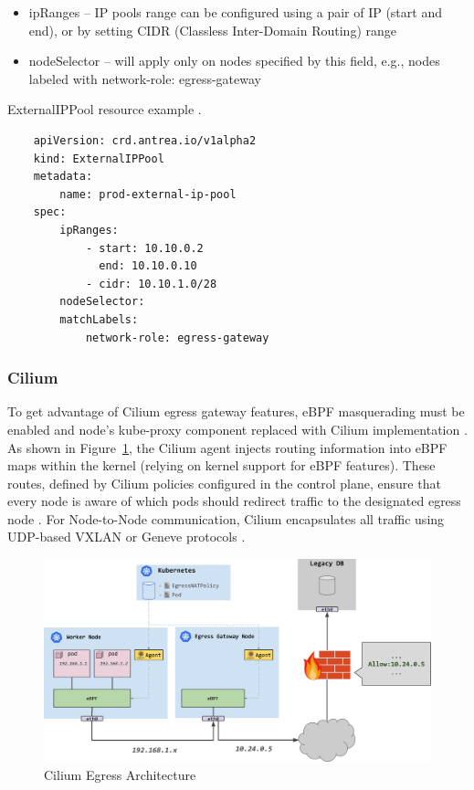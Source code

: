 \begin{itemize}
    \item ipRanges -- IP pools range can be configured using a pair of IP (start and end), or by setting CIDR (Classless Inter-Domain Routing) range
    \item nodeSelector -- will apply only on nodes specified by this field, e.g., nodes labeled with network-role: egress-gateway
\end{itemize}

\begin{listing}[htb]
    \centering
    \caption{ExternalIPPool resource example \cite{AntreaEgressArch}.}
    \begin{verbatim}
    apiVersion: crd.antrea.io/v1alpha2
    kind: ExternalIPPool
    metadata:
        name: prod-external-ip-pool
    spec:
        ipRanges:
            - start: 10.10.0.2
              end: 10.10.0.10
            - cidr: 10.10.1.0/28
        nodeSelector:
        matchLabels:
            network-role: egress-gateway
    \end{verbatim}
    \label{lst:yamlAntreaExternalIPPool}
\end{listing}
  


\subsubsection{Cilium}
\label{subsection:ciliumEgress}

To get advantage of Cilium egress gateway features, eBPF masquerading must be enabled and node's kube-proxy component replaced with Cilium implementation \cite{CiliumEgressGateway}. As shown in Figure~\ref{fig:ciliumEgressArch}, the Cilium agent injects routing information into eBPF maps within the kernel (relying on kernel support for eBPF features). These routes, defined by Cilium policies configured in the control plane, ensure that every node is aware of which pods should redirect traffic to the designated egress node \cite{CiliumEgressGateway}. For Node-to-Node communication, Cilium encapsulates all traffic using UDP-based VXLAN or Geneve protocols \cite{CiliumRouting}.

\begin{figure}[tbh]
    \centering
    \includegraphics[width=0.9\columnwidth]{images/cilium_egress.png}
    \caption{Cilium Egress Architecture \cite{CiliumEgressGatewayBlog}}
    \label{fig:ciliumEgressArch}
\end{figure}

